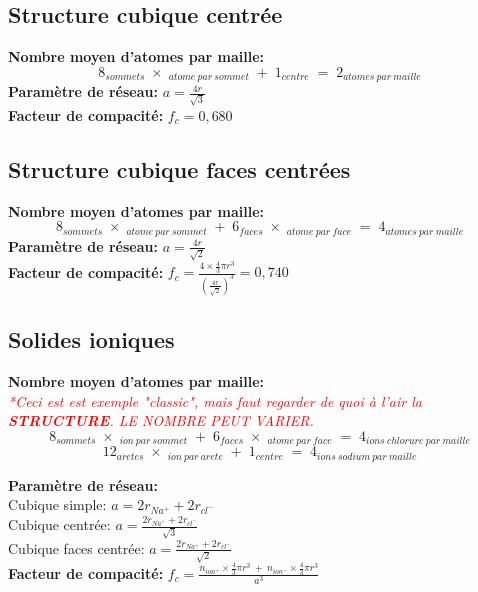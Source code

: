 \documentclass[twocolumn,letterpaper,8pt]{extarticle}
\newcommand{\warning}[1]{\textcolor{red}{\scriptsize\textit{#1}}}
\begin{document}
\subsection{Structure cubique centrée}
\textbf{Nombre moyen d'atomes par maille:}
$$\mathop{8}_{sommets} \times \mathop{\frac{1}{8}}_{atome\ par\ sommet} + \mathop{1}_{centre} = \mathop{2}_{atomes\ par\ maille}$$
\textbf{Paramètre de réseau:} $a=\frac{4r}{\sqrt{3}}$\\
\textbf{Facteur de compacité:} $f_c=0,680$

\subsection{Structure cubique faces centrées}
\textbf{Nombre moyen d'atomes par maille:}
$$\mathop{8}_{sommets} \times \mathop{\frac{1}{8}}_{atome\ par\ sommet} + \mathop{6}_{faces} \times \mathop{\frac{1}{2}}_{atome\ par\ face} = \mathop{4}_{atomes\ par\ maille}$$
\textbf{Paramètre de réseau:} $a=\frac{4r}{\sqrt{2}}$\\
\textbf{Facteur de compacité:} $f_c=\frac{4 \times \frac{4}{3}\pi r^3}{(\frac{4r}{\sqrt{2}})^3}=0,740$

\subsection{Solides ioniques}
\textbf{Nombre moyen d'atomes par maille:}\\
\warning{*Ceci est est exemple "classic", mais faut regarder de quoi à l'air la \textbf{STRUCTURE}. LE NOMBRE PEUT VARIER.}
$$\mathop{8}_{sommets} \times \mathop{\frac{1}{8}}_{ion\ par\ sommet} + \mathop{6}_{faces} \times \mathop{\frac{1}{2}}_{atome\ par\ face} = \mathop{4}_{ions\ chlorure\ par\ maille}$$
$$\mathop{12}_{aretes} \times \mathop{\frac{1}{4}}_{ion\ par\ arete} + \mathop{1}_{centre} = \mathop{4}_{ions\ sodium\ par\ maille}$$

\textbf{Paramètre de réseau:}\\
Cubique simple: $a=2r_{Na^+}+2r_{cl^-}$\\
Cubique centrée: $a=\frac{2r_{Na^+}+2r_{cl^-}}{\sqrt{3}}$\\
Cubique faces centrée: $a=\frac{2r_{Na^+}+2r_{cl^-}}{\sqrt{2}}$\\
\textbf{Facteur de compacité:} {\large $f_c=\frac{n_{ion^+} \times \frac{4}{3}\pi r^3\ +\ n_{ion^-} \times \frac{4}{3}\pi r^3}{a^3}$}


\end{document}
